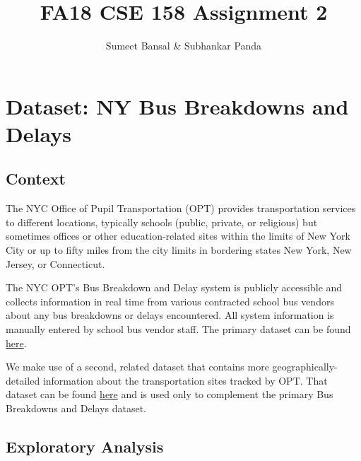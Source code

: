 \documentclass[11pt]{article}
\title{FA18 CSE 158 Assignment 2}
\author{Sumeet Bansal \& Subhankar Panda}
\begin{document}
\maketitle

\section{Dataset: NY Bus Breakdowns and Delays}
\subsection{Context}
The NYC Office of Pupil Transportation (OPT) provides transportation services to different locations, typically schools (public, private, or religious) but sometimes offices or other education-related sites within the limits of New York City or up to fifty miles from the city limits in bordering states New York, New Jersey, or Connecticut.

The NYC OPT's Bus Breakdown and Delay system is publicly accessible and collects information in real time from various contracted school bus vendors about any bus breakdowns or delays encountered. All system information is manually entered by school bus vendor staff. The primary dataset can be found \href{https://data.cityofnewyork.us/Transportation/Bus-Breakdown-and-Delays/ez4e-fazm}{\color{blue}here}.

We make use of a second, related dataset that contains more geographically-detailed information about the transportation sites tracked by OPT. That dataset can be found \href{https://data.cityofnewyork.us/Transportation/Transportation-Sites/hg3c-2jsy}{\color{blue}here} and is used only to complement the primary Bus Breakdowns and Delays dataset.

\subsection{Exploratory Analysis}
\end{document}
